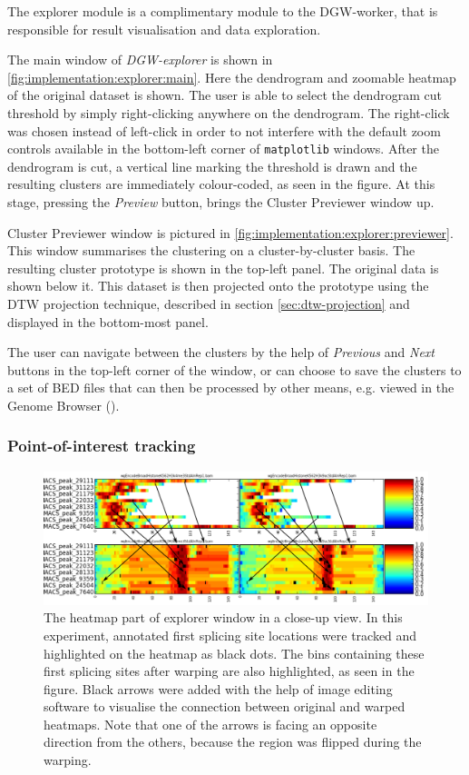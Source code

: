 \documentclass[parskip]{cs4rep}
\newcommand{\pythonpackage}[1]{{\tt #1}}
\begin{document}
The explorer module is a complimentary module to the DGW-worker, that is responsible for result
visualisation and data exploration.

The main window of \emph{DGW-explorer} is shown in \autoref{fig:implementation:explorer:main}.
Here the dendrogram and zoomable heatmap of the original dataset is shown. The user is able to select the dendrogram cut threshold by simply right-clicking anywhere on the dendrogram. 
The right-click was chosen instead of left-click in order to not interfere with the default zoom controls available in the bottom-left corner of \pythonpackage{matplotlib} windows. After the dendrogram is cut, a vertical line marking the threshold is drawn and the resulting clusters are immediately colour-coded, as seen in the figure. At this stage, pressing the \emph{Preview} button, brings the Cluster Previewer window up.
 
Cluster Previewer window is pictured in \autoref{fig:implementation:explorer:previewer}.
This window summarises the clustering on a cluster-by-cluster basis. The resulting cluster prototype is shown in the top-left panel. The original data is shown below it. This dataset is then projected onto the prototype using the DTW projection technique, described in section \ref{sec:dtw-projection} and displayed in the bottom-most panel.

 The user can navigate between the clusters by the help of \emph{Previous} and \emph{Next} buttons in the top-left corner of the window, or can choose to save the clusters to a set of BED files that can then be processed by other means, e.g. viewed in the Genome Browser (\cite{Kent:2002wd}).

\subsubsection{Point-of-interest tracking}
\label{sec:poi-tracking}

\begin{figure}[t,b]
   \centering
   \includegraphics[width=\textwidth]{figures/implementation/explorer/poi_tracking.png}
   \caption{The heatmap part of explorer window in a close-up view. In this experiment, annotated first splicing site locations were tracked and highlighted on the heatmap as black dots. The bins containing these first splicing sites after warping are also highlighted, as seen in the figure. Black arrows were added with the help of image editing software to visualise the connection between original and warped heatmaps. Note that one of the arrows is facing an opposite direction from the others, because the region was flipped during the warping.}  
   \label{fig:implementation:explorer:poi-tracking}
\end{figure}
\end{document}
